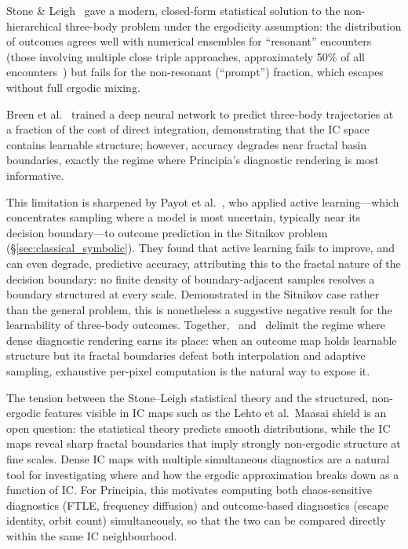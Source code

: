 \documentclass[11pt,a4paper]{article}
\begin{document}
Stone \& Leigh~\cite{stone2019} gave a modern, closed-form statistical solution to the
non-hierarchical three-body problem under the ergodicity assumption: the distribution of
outcomes agrees well with numerical ensembles for ``resonant'' encounters (those involving
multiple close triple approaches, approximately 50\% of all encounters~\cite{stone2019}) but fails for the
non-resonant (``prompt'') fraction, which escapes without full ergodic mixing.

Breen et al.~\cite{breen2020} trained a deep neural network to predict three-body trajectories
at a fraction of the cost of direct integration, demonstrating that the IC space contains
learnable structure; however, accuracy degrades near fractal basin boundaries, exactly the
regime where Principia's diagnostic rendering is most informative.

This limitation is sharpened by Payot et al.~\cite{payot2023}, who applied active
learning---which concentrates sampling where a model is most uncertain, typically near its
decision boundary---to outcome prediction in the Sitnikov problem (\S\ref{sec:classical_symbolic}).
They found that active learning fails to improve, and can even degrade, predictive accuracy,
attributing this to the fractal nature of the decision boundary: no finite density of
boundary-adjacent samples resolves a boundary structured at every scale.  Demonstrated in the
Sitnikov case rather than the general problem, this is nonetheless a suggestive negative result
for the learnability of three-body outcomes.  Together,~\cite{breen2020} and~\cite{payot2023}
delimit the regime where dense diagnostic rendering earns its place: when an outcome map holds
learnable structure but its fractal boundaries defeat both interpolation and adaptive sampling,
exhaustive per-pixel computation is the natural way to expose it.

The tension between the Stone--Leigh statistical theory and the structured, non-ergodic
features visible in IC maps such as the Lehto et al.\ Maasai shield is an open question: the statistical theory
predicts smooth distributions, while the IC maps reveal sharp fractal boundaries that imply
strongly non-ergodic structure at fine scales.  Dense IC maps with multiple simultaneous
diagnostics are a natural tool for investigating where and how the ergodic approximation breaks
down as a function of IC.  For Principia, this motivates computing both chaos-sensitive
diagnostics (FTLE, frequency diffusion) and outcome-based diagnostics (escape identity, orbit
count) simultaneously, so that the two can be compared directly within the same IC neighbourhood.
\end{document}
